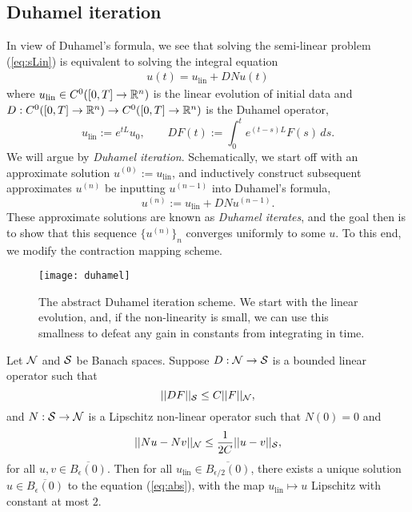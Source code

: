 \subsection{Duhamel iteration}

In view of Duhamel's formula, we see that solving the semi-linear problem (\ref{eq:sLin}) is equivalent to solving the integral equation 
	\begin{align}
		u(t) =  u_{\text{lin}} + DN u(t)
		\tag{sLin'} 
		\label{eq:abs}
	\end{align}	
where $u_{\text{lin}} \in C^0 ([0, T] \to \mathbb R^n)$ is the linear evolution of initial data and $D : C^0 ([0, T] \to \mathbb R^n) \to C^0 ([0, T] \to \mathbb R^n)$ is the Duhamel operator,
	\[ u_{\text{lin}} := e^{tL} u_0 ,\qquad DF (t) := \int_0^t e^{(t - s) L} F(s) \, ds. \]	
We will argue by \textit{Duhamel iteration}. Schematically, we start off with an approximate solution $u^{(0)} := u_{\text{lin}}$, and inductively construct subsequent approximates $u^{(n)}$ be inputting $u^{(n - 1)}$ into Duhamel's formula, 
	\[ u^{(n)} := u_{\text{lin}} + DN u^{(n - 1)}.  \]
These approximate solutions are known as \emph{Duhamel iterates}, and the goal then is to show that this sequence $\{u^{(n)}\}_n$ converges uniformly to some $u$. To this end, we modify the contraction mapping scheme.

	\begin{figure}[h]
		\begin{center}
			\texttt{[image: duhamel]}
			\caption{The abstract Duhamel iteration scheme. We start with the linear evolution, and, if the non-linearity is small, we can use this smallness to defeat any gain in constants from integrating in time. }
		\end{center}
	\end{figure}

\begin{lemma}
	Let $\mathcal N$ and $\mathcal S$ be Banach spaces. Suppose  $D: \mathcal N \to \mathcal S$ is a bounded linear operator such that
		\[ ||DF||_{\mathcal S} \leq C ||F||_{\mathcal N}, \]
	and	 $N : \mathcal S \to \mathcal N$ is a Lipschitz non-linear operator such that $N(0) = 0$ and 
		\[ ||Nu - Nv||_{\mathcal N} \leq \frac{1}{2C} ||u - v||_{\mathcal S}, \]
	for all $u, v \in \overline{B_\epsilon (0)}$. Then for all $u_{\text{lin}} \in \overline{B_{\epsilon/2} (0)}$, there exists a unique solution $u \in \overline{B_\epsilon (0)}$ to the equation (\ref{eq:abs}), with the map $u_{\text{lin}} \mapsto u$ Lipschitz with constant at most $2$.
\end{lemma}

